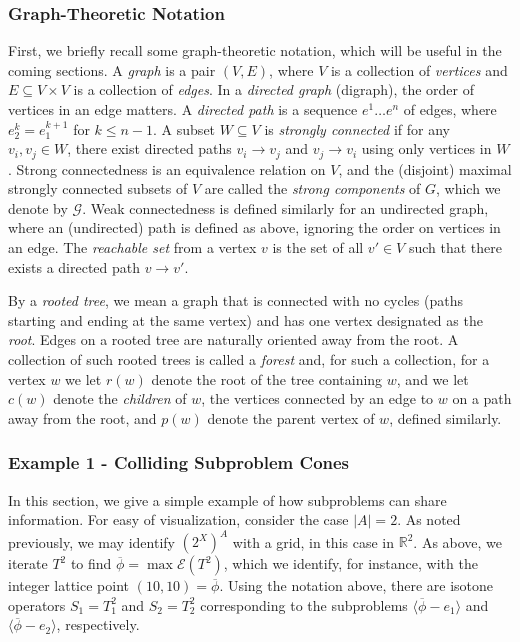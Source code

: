 \documentclass[11pt,reqno]{amsart}
\theoremstyle{definition}
\numberwithin{equation}{section}
\newcommand{\mr}{\mathbb{R}}
\newcommand{\ol}{\overline}
\newcommand{\lag}{\langle}
\newcommand{\rag}{\rangle}
\newcommand{\pre}{\phi}
\newcommand{\prealloc}{(2^X)^A}
\newcommand{\sub}{\subseteq}
\newcommand{\fix}{\mathcal{E}}
\newcommand{\toppre}{\ol{\pre}}
\newcommand{\strongc}{\mathcal{G}}
\begin{document}
\subsubsection{Graph-Theoretic Notation}
First, we briefly recall some graph-theoretic notation, which will be useful in the coming sections. A \emph{graph} is a pair $(V,E)$, where $V$ is a collection of \emph{vertices} and $E \sub V \times V$ is a collection of \emph{edges}.
In a \emph{directed graph} (digraph), the order of vertices in an edge matters. 
A \emph{directed path} is a sequence $e^1 \hdots e^n$ of edges, where $e_2^k = e_1^{k+1}$ for $k \leq n-1$. 
A subset $W \sub V$ is \emph{strongly connected} if for any $v_i, v_j \in W$, there exist directed paths $v_i \to v_j$ and $v_j \to v_i$ using only vertices in $W$. 
Strong connectedness is an equivalence relation on $V$, and the (disjoint) maximal strongly connected subsets of $V$ are called the \emph{strong components} of $G$, which we denote by $\strongc$. 
Weak connectedness is defined similarly for an undirected graph, where an (undirected) path is defined as above, ignoring the order on vertices in an edge. 
The \emph{reachable set} from a vertex $v$ is the set of all $v' \in V$ such that there exists a directed path $v \to v'$. 

By a \emph{rooted tree}, we mean a graph that is connected with no cycles (paths starting and ending at the same vertex) and has one vertex designated as the \emph{root}. 
Edges on a rooted tree are naturally oriented away from the root. 
A collection of such rooted trees is called a \emph{forest} and, for such a collection, for a vertex $w$ we let $r(w)$ denote the root of the tree containing $w$, and we let $c(w)$ denote the \emph{children} of $w$, the vertices connected by an edge to $w$ on a path away from the root, and $p(w)$ denote the parent vertex of $w$, defined similarly.  

\subsubsection{Example 1 - Colliding Subproblem Cones}
In this section, we give a simple example of how subproblems can share information.
For easy of visualization, consider the case $|A| = 2$. As noted previously, we may identify $\prealloc$ with a grid, in this case in $\mr^2$.
As above, we iterate $T^2$ to find $\toppre = \max \fix(T^2)$, which we identify, for instance, with the integer lattice point $(10,10) = \toppre$. 
Using the notation above, there are isotone operators $S_1 = T_1^2$ and $S_2 = T_2^2$ corresponding to the subproblems $\lag \toppre - e_1 \rag$ and $\lag \toppre - e_2 \rag$, respectively. 
\end{document}
